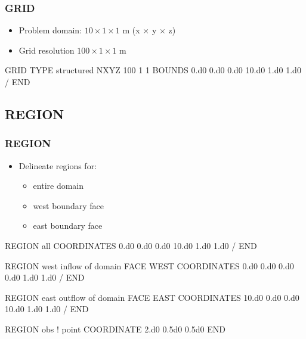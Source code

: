 \documentclass{beamer}
\newcommand\bluecomment[1]{{{\color{blue} #1}}}
\newcommand\magentacomment[1]{{{\color{magenta} #1}}}
\begin{document}
\begin{frame}\frametitle{GRID}

\begin{itemize}
  \item Problem domain: $10 \times 1 \times 1$ m (x $\times$ y $\times$ z)
  \item Grid resolution $100 \times 1 \times 1$ m
\end{itemize}

\begin{semiverbatim}
GRID
  TYPE structured
  NXYZ 100 1 1
  BOUNDS
    0.d0 0.d0 0.d0
    10.d0 1.d0 1.d0
  /
END
\end{semiverbatim}

\end{frame}

\subsection{REGION}

\begin{frame}\frametitle{REGION}

\begin{itemize}
  \item Delineate regions for:
  \begin{itemize}
    \item entire domain
    \item west boundary face
    \item east boundary face
  \end{itemize}
\end{itemize}

\begin{semiverbatim}
REGION all
  COORDINATES
    0.d0  0.d0 0.d0
    10.d0 1.d0 1.d0
  /
END

\newpage
REGION west        \bluecomment{inflow of domain}
  FACE WEST
  COORDINATES
    0.d0 0.d0 0.d0
    0.d0 1.d0 1.d0
  /
END

REGION east           \bluecomment{outflow of domain}
  FACE EAST
  COORDINATES
    10.d0 0.d0 0.d0
    10.d0 1.d0 1.d0
  /
END

REGION obs      \bluecomment{! point}
  \magentacomment{COORDINATE} 2.d0 0.5d0 0.5d0
END

\end{semiverbatim}

\end{frame}
\end{document}
